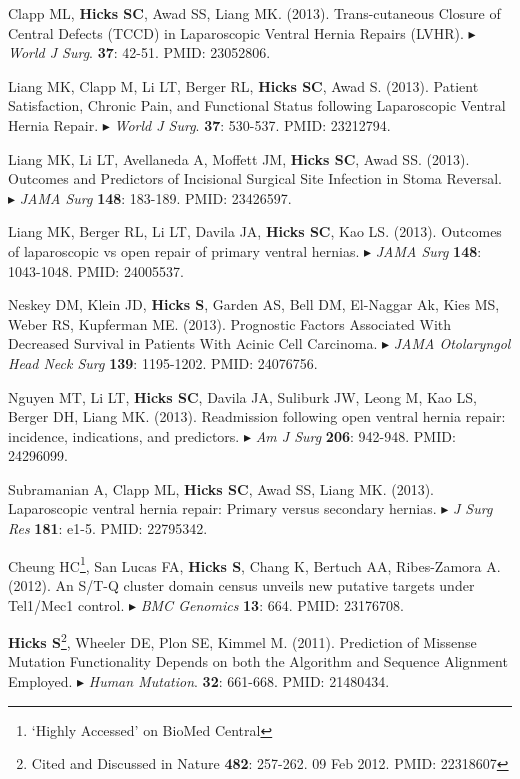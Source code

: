 \documentclass[10pt]{article}
\newcommand{\mine}{
  \addtocounter{enumi}{1}
\item[\fcolorbox{white}{grey}{\color{white} \tiny \arabic{enumi}}]
}
\newcommand{\dg}[1]{{\color{black} $\blacktriangleright$ {#1}}}
\begin{document}
\item Clapp ML, \textbf{Hicks SC}, Awad SS, Liang MK. (2013). Trans-cutaneous Closure of Central Defects (TCCD) in Laparoscopic Ventral Hernia Repairs (LVHR). \dg{{\it World J Surg}. {\bf 37}: 42-51. PMID: 23052806}.
\item Liang MK, Clapp M, Li LT, Berger RL, {\bf Hicks SC}, Awad S. (2013). Patient Satisfaction, Chronic Pain, and Functional Status following Laparoscopic Ventral Hernia Repair. \dg{{\it World J Surg}. {\bf 37}: 530-537. PMID: 23212794}.
\item Liang MK, Li LT, Avellaneda A, Moffett JM, {\bf Hicks SC}, Awad SS. (2013). Outcomes and Predictors of Incisional Surgical Site Infection in Stoma Reversal. \dg{{\it JAMA Surg} {\bf 148}: 183-189. PMID: 23426597}.
\item Liang MK, Berger RL, Li LT, Davila JA, {\bf Hicks SC}, Kao LS. (2013). Outcomes of laparoscopic vs open repair of primary ventral hernias. \dg{{\it JAMA Surg} {\bf 148}: 1043-1048. PMID: 24005537}.
\item Neskey DM, Klein JD, {\bf Hicks S}, Garden AS, Bell DM, El-Naggar Ak, Kies MS, Weber RS, Kupferman ME. (2013). Prognostic Factors Associated With Decreased Survival in Patients With Acinic Cell Carcinoma. \dg{{\it JAMA Otolaryngol Head Neck Surg} {\bf 139}: 1195-1202. PMID: 24076756}.
\item Nguyen MT, Li LT, {\bf Hicks SC}, Davila JA, Suliburk JW, Leong M, Kao LS, Berger DH, Liang MK. (2013). Readmission following open ventral hernia repair: incidence, indications, and predictors.\dg{{\it Am J Surg} {\bf 206}: 942-948. PMID: 24296099}.
\item Subramanian A, Clapp ML, {\bf Hicks SC}, Awad SS, Liang MK. (2013). Laparoscopic ventral hernia repair: Primary versus secondary hernias. \dg{{\it J Surg Res} {\bf 181}: e1-5. PMID: 22795342}.
\item Cheung HC\footnote{ `Highly Accessed' on BioMed Central}, San Lucas FA, \textbf{Hicks S}, Chang K, Bertuch AA, Ribes-Zamora A. (2012). An S/T-Q cluster domain census unveils new putative targets under Tel1/Mec1 control. \dg{{\it BMC Genomics} {\bf 13}: 664. PMID: 23176708}.
\mine \textbf{Hicks S}\footnote{Cited and Discussed in Nature {\bf 482}: 257-262. 09 Feb 2012. PMID: 22318607}, Wheeler DE, Plon SE, Kimmel M. (2011). Prediction of Missense Mutation Functionality Depends on both the Algorithm and Sequence Alignment Employed. \dg{{\it Human Mutation}. {\bf 32}: 661-668. PMID: 21480434}.
\end{document}
